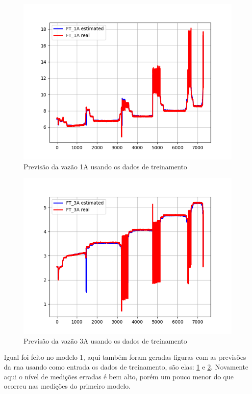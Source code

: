 \documentclass[12pt]{article}
\begin{document}
\begin{figure}
    \centering
    \includegraphics{results/complete-training-1A.png}
    \caption{Previsão da vazão 1A usando os dados de treinamento}
    \label{fig:complete-training-1A}
\end{figure}

\begin{figure}
    \centering
    \includegraphics{results/complete-training-3A.png}
    \caption{Previsão da vazão 3A usando os dados de treinamento}
    \label{fig:complete-training-3A}
\end{figure}

Igual foi feito no modelo 1, aqui também foram geradas figuras com as previsões da \acrshort{rna} usando como entrada os dados de treinamento, são elas: \ref{fig:complete-training-1A} e \ref{fig:complete-training-3A}.
Novamente aqui o nível de medições erradas é bem alto, porém um pouco menor do que ocorreu nas medições do primeiro modelo.
\end{document}
